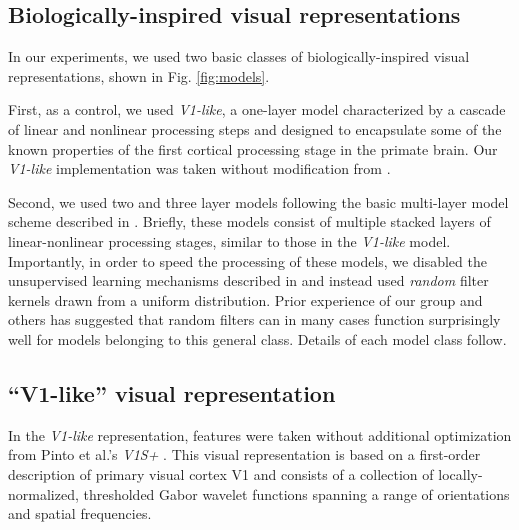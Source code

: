 \subsection{Biologically-inspired visual representations}
\label{sec:models}

In our experiments, we used two basic classes of biologically-inspired visual 
representations, shown in Fig.
\ref{fig:models}. 

First, as a  control, we used \emph{V1-like}, a 
one-layer model characterized by a
cascade of linear and nonlinear processing steps and designed to encapsulate
some of the known properties of the first cortical processing stage in the
primate brain.  Our \emph{V1-like} implementation was taken without modification from
\cite{pinto:plos08,pinto:eccv08}.

Second, we used two and three layer models following the basic multi-layer model
scheme described in \cite{pinto:plos09}.  Briefly, these
models consist of multiple stacked layers of linear-nonlinear processing stages,
similar to those in the \emph{V1-like} model.  Importantly, in order to speed the
processing of these models, we disabled the unsupervised learning mechanisms described in
\cite{pinto:plos09} and instead used \emph{random} filter kernels drawn from a uniform
distribution.  Prior experience of our group and others \cite{jarrett-iccv-09}
has suggested that random filters can in many cases function surprisingly well
for models belonging to this general class. Details of each model class follow.


\subsection{``V1-like'' visual representation}

In the \emph{V1-like} representation, features were taken without additional
optimization from Pinto et al.'s \emph{V1S+} \cite{pinto:plos08}.  This visual
representation is based on a first-order description of primary visual cortex V1
and consists of a collection of locally-normalized, thresholded Gabor wavelet
functions spanning a range of orientations and spatial frequencies.


